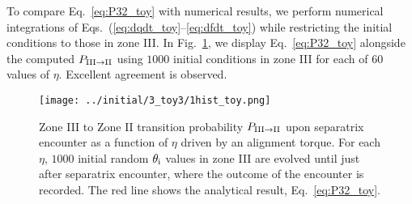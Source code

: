 \documentclass[
        fleqn,
        usenatbib,
        referee
    ]{mnras}
\newlength{\colummwidth}
\begin{document}
To compare Eq.~\eqref{eq:P32_toy} with numerical results, we perform numerical
integrations of Eqs.~(\ref{eq:dqdt_toy}--\ref{eq:dfdt_toy}) while restricting
the initial conditions to those in zone III\@. In Fig.~\ref{fig:1hist_toy}, we
display Eq.~\eqref{eq:P32_toy} alongside the computed $P_{\rm III \to II}$ using
$1000$ initial conditions in zone III for each of $60$ values of $\eta$.
Excellent agreement is observed.
\begin{figure}
    \centering
    \texttt{[image: ../initial/3\_toy3/1hist\_toy.png]}
    \caption{Zone III to Zone II transition probability $P_{\rm III \to II}$
    upon separatrix encounter as a function of $\eta$ driven by an alignment
    torque. For each $\eta$, $1000$ initial random $\theta_{\rm i}$ values in
    zone III are evolved until just after separatrix encounter, where the
    outcome of the encounter is recorded. The red line shows the analytical
    result, Eq.~\eqref{eq:P32_toy}.}\label{fig:1hist_toy}
\end{figure}
\end{document}
